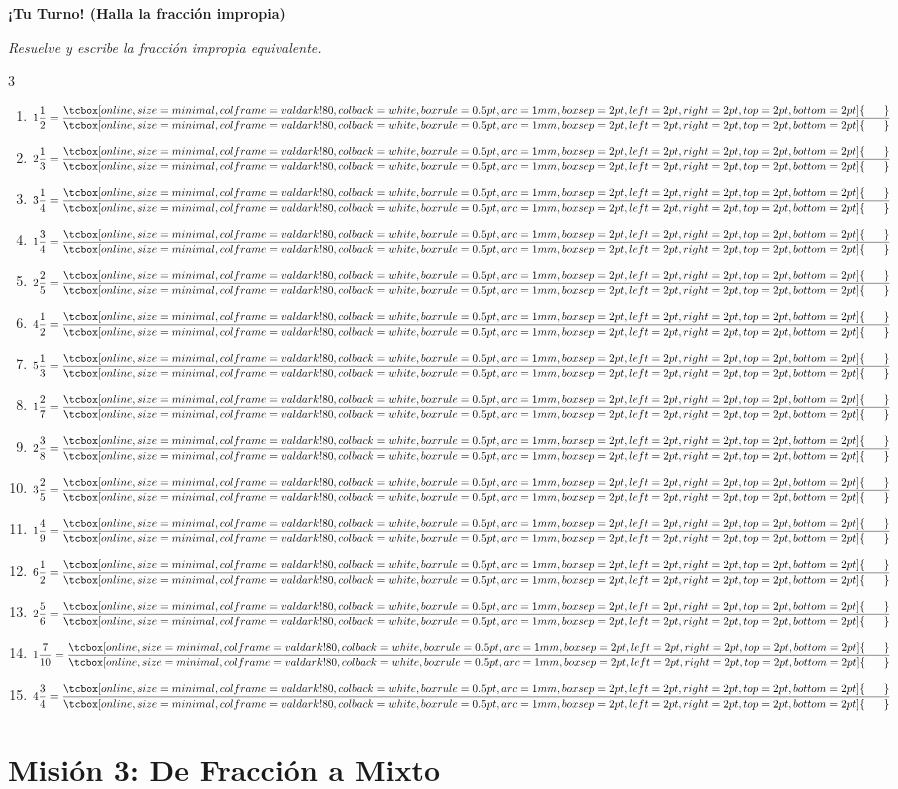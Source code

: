 \documentclass[12pt, letterpaper]{article}
\newenvironment{practica}[1]{
	\vspace{0.6cm}
	\begin{tcolorbox}[colback=white, colframe=valdark, boxrule=1pt, borderline west={4pt}{0pt}{valdark!50}, arc=2mm, top=3pt, bottom=3pt]
		\large\bfseries \ding{46} \textbf{¡Tu Turno! (#1)}
	\end{tcolorbox}
	\vspace{0.2cm}
}{
	\vspace{0.4cm}
}
\newcommand{\boxfill}[1][1.2cm]{\tcbox[on line, size=minimal, colframe=valdark!80, colback=white, boxrule=0.5pt, arc=1mm, boxsep=2pt, left=2pt, right=2pt, top=2pt, bottom=2pt]{\makebox[#1]{\vphantom{M}}}}
\begin{document}
	\begin{practica}{Halla la fracción impropia}
		\textit{Resuelve y escribe la fracción impropia equivalente.}
		
		\vspace{0.4cm}
		\begin{multicols}{3}
			\raggedcolumns
			\begin{enumerate}[itemsep=0.8cm]
				\item $1 \dfrac{1}{2} = \dfrac{\boxfill[0.6cm]}{\boxfill[0.6cm]}$
				\item $2 \dfrac{1}{3} = \dfrac{\boxfill[0.6cm]}{\boxfill[0.6cm]}$
				\item $3 \dfrac{1}{4} = \dfrac{\boxfill[0.6cm]}{\boxfill[0.6cm]}$
				\item $1 \dfrac{3}{4} = \dfrac{\boxfill[0.6cm]}{\boxfill[0.6cm]}$
				\item $2 \dfrac{2}{5} = \dfrac{\boxfill[0.6cm]}{\boxfill[0.6cm]}$
				\item $4 \dfrac{1}{2} = \dfrac{\boxfill[0.6cm]}{\boxfill[0.6cm]}$
				\item $5 \dfrac{1}{3} = \dfrac{\boxfill[0.6cm]}{\boxfill[0.6cm]}$
				\item $1 \dfrac{2}{7} = \dfrac{\boxfill[0.6cm]}{\boxfill[0.6cm]}$
				\item $2 \dfrac{3}{8} = \dfrac{\boxfill[0.6cm]}{\boxfill[0.6cm]}$
				\item $3 \dfrac{2}{5} = \dfrac{\boxfill[0.6cm]}{\boxfill[0.6cm]}$
				\item $1 \dfrac{4}{9} = \dfrac{\boxfill[0.6cm]}{\boxfill[0.6cm]}$
				\item $6 \dfrac{1}{2} = \dfrac{\boxfill[0.6cm]}{\boxfill[0.6cm]}$
				\item $2 \dfrac{5}{6} = \dfrac{\boxfill[0.6cm]}{\boxfill[0.6cm]}$
				\item $1 \dfrac{7}{10} = \dfrac{\boxfill[0.6cm]}{\boxfill[0.6cm]}$
				\item $4 \dfrac{3}{4} = \dfrac{\boxfill[0.6cm]}{\boxfill[0.6cm]}$
			\end{enumerate}
		\end{multicols}
	\end{practica}
	
	
	\section*{Misión 3: De Fracción a Mixto}
	
\end{document}
